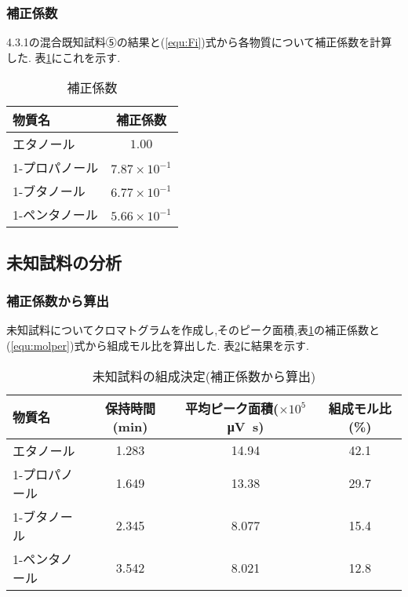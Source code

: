 \subsubsection{補正係数}
4.3.1の混合既知試料⑤の結果と(\ref{equ:Fi})式から各物質について補正係数を計算した.
表\ref{tab:Fi}にこれを示す.
\begin{table}[h]
   \caption{補正係数}
   \label{tab:Fi}
   \centering
   \begin{tabular}{lc}
     \hline
     物質名 & 補正係数 \\
     \hline \hline
     エタノール & $1.00$ \\
     1-プロパノール & $7.87\times10^{-1}$ \\
     1-ブタノール & $6.77\times10^{-1}$ \\
     1-ペンタノール & $5.66\times10^{-1}$ \\
     \hline
   \end{tabular}
\end{table}
\subsection{未知試料の分析}
\subsubsection{補正係数から算出}
未知試料についてクロマトグラムを作成し,そのピーク面積,表\ref{tab:Fi}の補正係数と(\ref{equ:molper})式から組成モル比を算出した.
表\ref{tab:miti_hosei}に結果を示す.
\begin{table}[h]
   \caption{未知試料の組成決定(補正係数から算出)}
   \label{tab:miti_hosei}
   \centering
   \begin{tabular}{l|ccc}
     \hline
     物質名 & 保持時間(\si{min}) & 平均ピーク面積($\times10^5$ \si{\micro \volt.\second}) & 組成モル比(\%) \\ 
     \hline \hline
     エタノール & 1.283 & 14.94 & 42.1 \\
     1-プロパノール & 1.649 & 13.38 & 29.7 \\
     1-ブタノール & 2.345 & 8.077 & 15.4 \\
     1-ペンタノール & 3.542 & 8.021 & 12.8 \\
     \hline
   \end{tabular}
\end{table}
